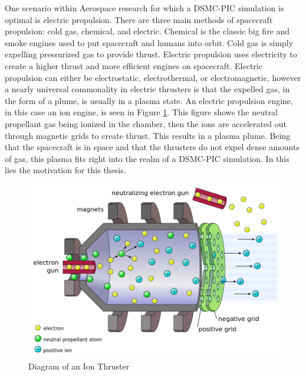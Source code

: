 \indent One scenario within Aerospace research for which a DSMC-PIC simulation is optimal is electric propulsion. There are three main methods of spacecraft propulsion: cold gas, chemical, and electric. Chemical is the classic big fire and smoke engines used to put spacecraft and humans into orbit. Cold gas is simply expelling pressurized gas to provide thrust. Electric propulsion uses electricity to create a higher thrust and more efficient engines on spacecraft. Electric propulsion can either be electrostatic, electrothermal, or electromagnetic, however a nearly universal commonality in electric thrusters is that the expelled gas, in the form of a plume, is usually in a plasma state. An electric propulsion engine, in this case an ion engine, is seen in Figure \ref{fig:ion_thruster}. This figure shows the neutral propellant gas being ionized in the chamber, then the ions are accelerated out through magnetic grids to create thrust. This results in a plasma plume. Being that the spacecraft is in space and that the thrusters do not expel dense amounts of gas, this plasma fits right into the realm of a DSMC-PIC simulation. In this lies the motivation for this thesis. \par


\begin{figure}
    \includegraphics[width=.85\textwidth]{figures/ion_thruster.png}
    \centering
    \caption{Diagram of an Ion Thruster \cite{ion_thruster} }
    \label{fig:ion_thruster}
\end{figure}




